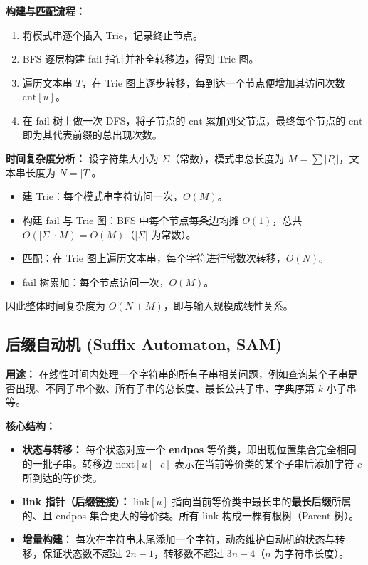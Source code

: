 \textbf{构建与匹配流程：}
\begin{enumerate}
  \item 将模式串逐个插入 Trie，记录终止节点。
  \item BFS 逐层构建 fail 指针并补全转移边，得到 Trie 图。
  \item 遍历文本串 $T$，在 Trie 图上逐步转移，每到达一个节点便增加其访问次数 $\text{cnt}[u]$。
  \item 在 fail 树上做一次 DFS，将子节点的 $\text{cnt}$ 累加到父节点，最终每个节点的 $\text{cnt}$ 即为其代表前缀的总出现次数。
\end{enumerate}

\textbf{时间复杂度分析：}
设字符集大小为 $\Sigma$（常数），模式串总长度为 $M = \sum |P_i|$，文本串长度为 $N = |T|$。
\begin{itemize}
  \item 建 Trie：每个模式串字符访问一次，$O(M)$。
  \item 构建 fail 与 Trie 图：BFS 中每个节点每条边均摊 $O(1)$，总共 $O(|\Sigma| \cdot M) = O(M)$（$|\Sigma|$ 为常数）。
  \item 匹配：在 Trie 图上遍历文本串，每个字符进行常数次转移，$O(N)$。
  \item fail 树累加：每个节点访问一次，$O(M)$。
\end{itemize}
因此整体时间复杂度为 $O(N + M)$，即与输入规模成线性关系。



\subsection{后缀自动机 (Suffix Automaton, SAM)}

\textbf{用途：} 在线性时间内处理一个字符串的所有子串相关问题，例如查询某个子串是否出现、不同子串个数、所有子串的总长度、最长公共子串、字典序第 $k$ 小子串等。

\textbf{核心结构：}
\begin{itemize}
  \item \textbf{状态与转移：} 每个状态对应一个 \textbf{endpos} 等价类，即出现位置集合完全相同的一批子串。转移边 $\text{next}[u][c]$ 表示在当前等价类的某个子串后添加字符 $c$ 所到达的等价类。
  \item \textbf{link 指针（后缀链接）：} $\text{link}[u]$ 指向当前等价类中最长串的\textbf{最长后缀}所属的、且 endpos 集合更大的等价类。所有 link 构成一棵有根树（Parent 树）。
  \item \textbf{增量构建：} 每次在字符串末尾添加一个字符，动态维护自动机的状态与转移，保证状态数不超过 $2n-1$，转移数不超过 $3n-4$（$n$ 为字符串长度）。
\end{itemize}


